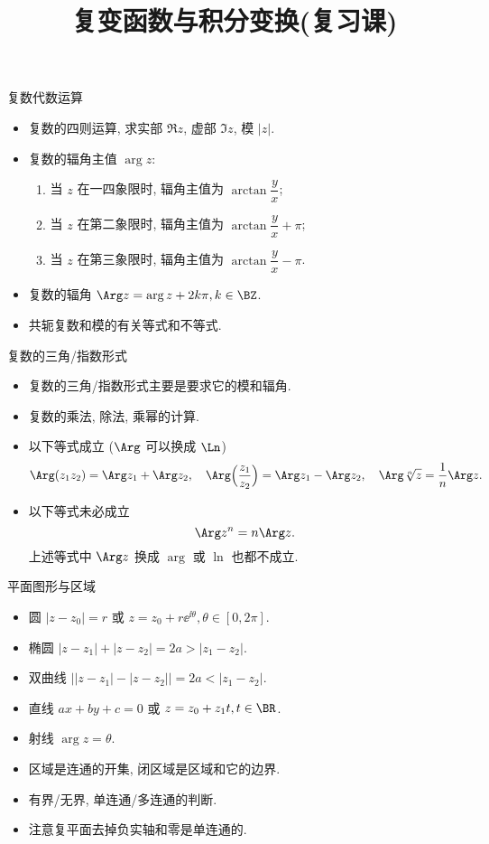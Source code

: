 \documentclass[aspectratio=169,handout]{ctexbeamer}
\title{复变函数与积分变换(复习课)}
\begin{document}
\begin{frame}{复数代数运算}
	\begin{itemize}
		\item 复数的四则运算, 求实部 $\Re z$, 虚部 $\Im z$, 模 $|z|$.
		\item 复数的辐角主值 $\arg z$:
		\begin{enumerate}
			\item 当 $z$ 在一四象限时, 辐角主值为 $\arctan\dfrac yx$;
			\item 当 $z$ 在第二象限时, 辐角主值为 $\arctan\dfrac yx+\pi$;
			\item 当 $z$ 在第三象限时, 辐角主值为 $\arctan\dfrac yx-\pi$.
		\end{enumerate}
		\item 复数的辐角 $\Arg z=\arg z+2k\pi,k\in\BZ$.
		\item 共轭复数和模的有关等式和不等式.
	\end{itemize}
\end{frame}


\begin{frame}{复数的三角/指数形式}
	\begin{itemize}
		\item 复数的三角/指数形式主要是要求它的模和辐角.
		\item 复数的乘法, 除法, 乘幂的计算.
		\item 以下等式成立 ($\Arg$ 可以换成 $\Ln$)
	\[
			\Arg (z_1z_2)=\Arg z_1+\Arg z_2,\quad 
			\Arg\Bigl(\frac{z_1}{z_2}\Bigr)=\Arg z_1-\Arg z_2,\quad
			\Arg\sqrt[n]{z}=\frac1n\Arg z.
	\]
		\item 以下等式未必成立
	\[
			\Arg z^n=n\Arg z.
	\]
		上述等式中 $\Arg z$ 换成 $\arg$ 或 $\ln$ 也都不成立.
	\end{itemize}
\end{frame}


\begin{frame}{平面图形与区域}
	\begin{itemize}
		\item 圆 $|z-z_0|=r$ 或 $z=z_0+r\ee^{\ii\theta},\theta\in[0,2\pi]$.
		\item 椭圆 $|z-z_1|+|z-z_2|=2a>|z_1-z_2|$.
		\item 双曲线 $\bigl||z-z_1|-|z-z_2|\bigr|=2a<|z_1-z_2|$.
		\item 直线 $ax+by+c=0$ 或 $z=z_0+z_1t,t\in\BR$.
		\item 射线 $\arg z=\theta$.
		\item 区域是连通的开集, 闭区域是区域和它的边界.
		\item 有界/无界, 单连通/多连通的判断.
		\item 注意复平面去掉负实轴和零是单连通的.
	\end{itemize}
\end{frame}
\end{document}
